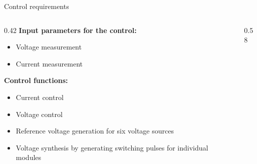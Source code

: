 \begin{frame}{Control requirements}
  \begin{columns}[c,onlytextwidth]
    \begin{column}{0.42\textwidth}
      \textbf{Input parameters for the control:}
      \begin{itemize}
        \setlength{\itemsep}{0.2em}
        \item Voltage measurement
        \item Current measurement
      \end{itemize}
      \vspace{0.4em}
      \textbf{Control functions:}
      \begin{itemize}
        \setlength{\itemsep}{0.2em}
        \item Current control
        \item Voltage control
        \item Reference voltage generation for six voltage sources
        \item Voltage synthesis by generating switching pulses for individual
              modules
      \end{itemize}
    \end{column}
    \begin{column}{0.58\textwidth}
      \centering
    \end{column}
  \end{columns}
\end{frame}
